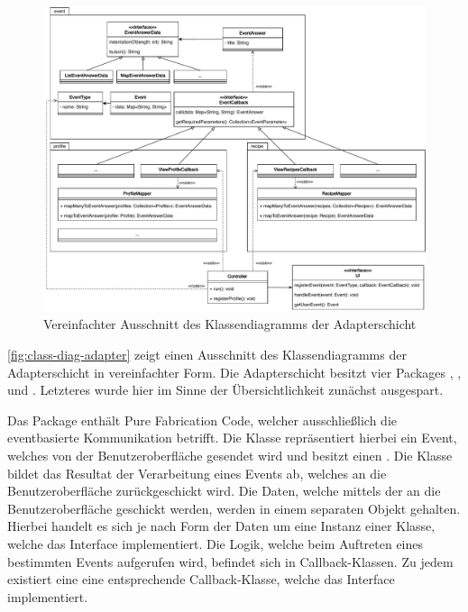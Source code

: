 \begin{figure}[ht!]
    \includegraphics[width=0.98\columnwidth]{../diagrams/adapter_uml.pdf}
    \caption{Vereinfachter Ausschnitt des Klassendiagramms der Adapterschicht}
    \label{fig:class-diag-adapter}
\end{figure}

\autoref{fig:class-diag-adapter} zeigt einen Ausschnitt des Klassendiagramms der Adapterschicht in vereinfachter Form. Die Adapterschicht besitzt vier Packages , ,  und . Letzteres wurde hier im Sinne der Übersichtlichkeit zunächst ausgespart. 

Das Package  enthält Pure Fabrication Code, welcher ausschließlich die eventbasierte Kommunikation betrifft. Die Klasse  repräsentiert hierbei ein Event, welches von der Benutzeroberfläche gesendet wird und besitzt einen . Die Klasse  bildet das Resultat der Verarbeitung eines Events ab, welches an die Benutzeroberfläche zurückgeschickt wird. Die Daten, welche mittels der  an die Benutzeroberfläche geschickt werden, werden in einem separaten Objekt gehalten. Hierbei handelt es sich je nach Form der Daten um eine Instanz einer Klasse, welche das Interface  implementiert. Die Logik, welche beim Auftreten eines bestimmten Events aufgerufen wird, befindet sich in Callback-Klassen. Zu jedem  existiert eine eine entsprechende Callback-Klasse, welche das Interface  implementiert.


